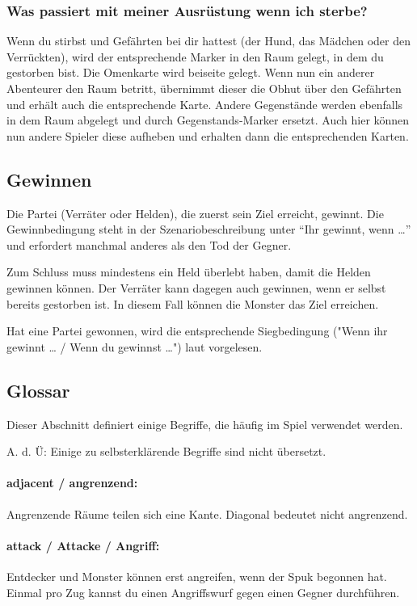 \subsubsection{Was passiert mit meiner Ausrüstung wenn ich sterbe?}

Wenn du stirbst und Gefährten bei dir hattest (der Hund, das Mädchen oder den Verrückten), wird der entsprechende Marker in den Raum gelegt, in dem du gestorben bist. Die Omenkarte wird beiseite gelegt. Wenn nun ein anderer Abenteurer den Raum betritt, übernimmt dieser die Obhut über den Gefährten und erhält auch die entsprechende Karte. Andere Gegenstände werden ebenfalls in dem Raum abgelegt und durch Gegenstands-Marker ersetzt. Auch hier können nun andere Spieler diese aufheben und erhalten dann die entsprechenden Karten.

\subsection{Gewinnen}

Die Partei (Verräter oder Helden), die zuerst sein Ziel erreicht, gewinnt. Die Gewinnbedingung steht in der Szenariobeschreibung unter ``Ihr gewinnt, wenn …'' und erfordert manchmal anderes als den Tod der Gegner.

Zum Schluss muss mindestens ein Held überlebt haben, damit die Helden gewinnen können. Der Verräter kann dagegen auch gewinnen, wenn er selbst bereits gestorben ist. In diesem Fall können die Monster das Ziel erreichen.

Hat eine Partei gewonnen, wird die entsprechende Siegbedingung ("Wenn ihr gewinnt … / Wenn du gewinnst …") laut vorgelesen.

\subsection{Glossar}

Dieser Abschnitt definiert einige Begriffe, die häufig im Spiel verwendet werden.

A. d. Ü: Einige zu selbsterklärende Begriffe sind nicht übersetzt.

\paragraph{adjacent / angrenzend:} Angrenzende Räume teilen sich eine Kante. Diagonal bedeutet nicht angrenzend.

\paragraph{attack / Attacke / Angriff:} Entdecker und Monster können erst angreifen, wenn der Spuk begonnen hat. Einmal pro Zug kannst du einen Angriffswurf gegen einen Gegner durchführen.

